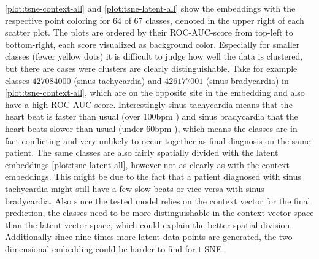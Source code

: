 \autoref{plot:tsne-context-all} and \autoref{plot:tsne-latent-all} show the embeddings with the respective point coloring for 64 of 67 classes, denoted in the upper right of each scatter plot. The plots are ordered by their ROC-AUC-score from top-left to bottom-right, each score visualized as background color. Especially for smaller classes (fewer yellow dots) it is difficult to judge how well the data is clustered, but there are cases were clusters are clearly distinguishable. Take for example classes $427084000$ (sinus tachycardia) and $426177001$ (sinus bradycardia) in \autoref{plot:tsne-context-all}, which are on the opposite site in the embedding and also have a high ROC-AUC-score. Interestingly sinus tachycardia means that the heart beat is faster than usual (over 100bpm \autocite{SinusTachycardiaCedarsSinai-2021-09-07}) and sinus bradycardia that the heart beats slower than usual (under 60bpm \autocite{SinusBradycardiaCedarsSinai-2021-09-07}), which means the classes are in fact conflicting and very unlikely to occur together as final diagnosis on the same patient. The same classes are also fairly spatially divided with the latent embeddings \autoref{plot:tsne-latent-all}, however not as clearly as with the context embeddings. This might be due to the fact that a patient diagnosed with sinus tachycardia might still have a few slow beats or vice versa with sinus bradycardia. Also since the tested model relies on the context vector for the final prediction, the classes need to be more distinguishable in the context vector space than the latent vector space, which could explain the better spatial division. Additionally since nine times more latent data points are generated, the two dimensional embedding could be harder to find for t-SNE.

